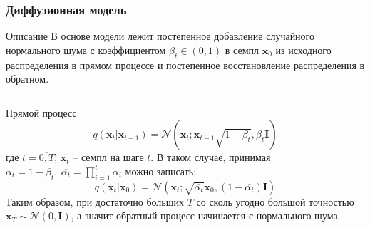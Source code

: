 \documentclass[8pt]{beamer}
\begin{document}
\begin{frame}
		\frametitle{Диффузионная модель}
		\begin{block}{Описание}
		В основе модели лежит постепенное добавление случайного нормального шума с коэффициентом $\beta_t\in (0,1)$ в семпл $\textbf{x}_0$ из исходного распределения в прямом процессе и постепенное восстановление распределения в обратном. 
		\end{block}
	\begin{columns}
		
		\begin{column}{0.5\textwidth}
			\begin{block}{Прямой процесс}
				\begin{equation*}
					q(\textbf{x}_t|\textbf{x}_{t-1}) = \mathcal{N}(\textbf{x}_t; \textbf{x}_{t-1}\sqrt{1-\beta_t}, \beta_t 	\textbf{I})
				\end{equation*}
					где $t = \overline{0,T}$, $\textbf{x}_t$ -- семпл на шаге $t$.
				В таком случае, принимая $\alpha_t  = 1 - \beta_t,~\overline{\alpha_t} = \prod_{i=1}^t \alpha_i$ можно записать:
				\begin{equation*}
					q(\textbf {x}_t | \textbf{x}_0 ) = \mathcal{N} (\textbf{x}_t; \sqrt{\overline{\alpha_t}} \textbf{x}_0, (1-\overline{\alpha_t}) \textbf{I})
				\end{equation*}
				Таким образом, при достаточно больших $T$ со сколь угодно большой точностью $\textbf{x}_T\sim \mathcal{N}(0, \textbf{I})$, а значит обратный процесс начинается с нормального шума.				
			\end{block}  	 
	\end{column}


\end{columns}
\end{frame}
\end{document}
